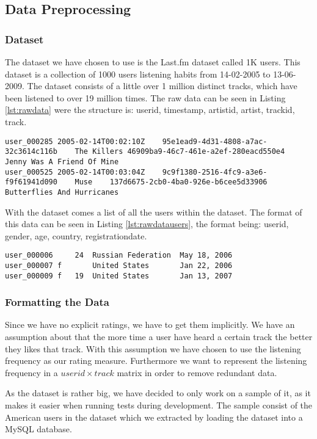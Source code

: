 \subsection{Data Preprocessing}
\subsubsection{Dataset}
The dataset we have chosen to use is the Last.fm\cite{lastfm} dataset called 1K users\parencite{lastfmdataset}. This dataset is a collection of 1000 users listening habits from 14-02-2005 to 13-06-2009. The dataset consists of a little over 1 million distinct tracks, which have been listened to over 19 million times. The raw data can be seen in Listing \ref{lst:rawdata} were the structure is: userid, timestamp, artistid, artist, trackid, track.

\begin{lstlisting}[caption={An example of the raw data from the 1K dataset},label=lst:rawdata]	
user_000285	2005-02-14T00:02:10Z	95e1ead9-4d31-4808-a7ac-32c3614c116b	The Killers	46909ba9-46c7-461e-a2ef-280eacd550e4	Jenny Was A Friend Of Mine
user_000525	2005-02-14T00:03:04Z	9c9f1380-2516-4fc9-a3e6-f9f61941d090	Muse	137d6675-2cb0-4ba0-926e-b6cee5d33906	Butterflies And Hurricanes
\end{lstlisting}

With the dataset comes a list of all the users within the dataset. The format of this data can be seen in Listing \ref{lst:rawdatausers}, the format being: userid, gender, age, country, registrationdate.

 \begin{lstlisting}[caption={An example of the representation of users in the dataset},label=lst:rawdatausers]	
user_000006		24	Russian Federation	May 18, 2006
user_000007	f	  	United States		Jan 22, 2006
user_000009	f	19	United States		Jan 13, 2007
\end{lstlisting}
\subsubsection{Formatting the Data}
Since we have no explicit ratings, we have to get them implicitly. We have an assumption about that the more time a user have heard a certain track the better they likes that track. With this assumption we have chosen to use the listening frequency as our rating measure. Furthermore we want to represent the listening frequency in a $userid \times track$ matrix in order to remove redundant data. 

As the dataset is rather big, we have decided to only work on a sample of it, as it makes it easier when running tests during development. The sample consist of the American users in the dataset which we extracted by loading the dataset into a MySQL database. 

